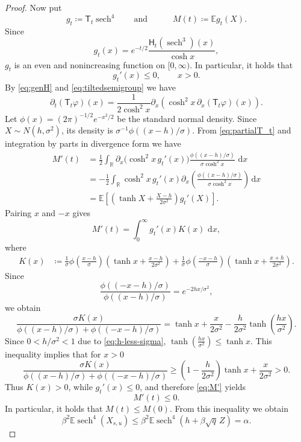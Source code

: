 \documentclass[11pt]{article}
\numberwithin{equation}{section}
\newcommand{\E}{\mathbb{E}}
\newcommand{\1}{\mathbf 1}
\newcommand{\sech}{\operatorname{sech}}
\newcommand{\dd}{\,\mathrm d}
\begin{document}
\begin{proof}
Now put
\[
 g_t\coloneqq\mathsf T_t \sech^4 \qquad \mbox{and}\quad
 \qquad
 M(t)\coloneqq\E g_t(X).
\]
Since
\[
 g_t(x)
 =
 e^{-t/2}\frac{\mathsf H_t(\sech^3)(x)}{\cosh x},
\]
$g_t$ is an even and nonincreasing function on $[0,\infty)$.
In particular, it holds that
\[
 g_t'(x)\le0,
 \qquad x>0.
\]
By \eqref{eq:genH} and \eqref{eq:tiltedsemigroup} we have
\begin{equation}\label{eq:partialT_t}
 \partial_t(\mathsf T_t\varphi)(x)
 =\frac{1}{2\cosh^2x}\partial_x\left(
   \cosh^2x\,\partial_x(\mathsf T_t\varphi)(x)
  \right).
\end{equation}
Let $\phi(x)=(2\pi)^{-1/2}e^{-x^2/2}$ be the standard normal density.
Since $X\sim N(h,\sigma^2)$, its density is
$\sigma^{-1}\phi((x-h)/\sigma)$.
From \eqref{eq:partialT_t} and integration by parts
in divergence form we have
\[
 \begin{aligned}
 M'(t)
 &=\frac12\int_{\mathbb R}
   \partial_x\bigl(\cosh^2x\,g_t'(x)\bigr)
   \frac{\phi((x-h)/\sigma)}{\sigma\cosh^2x}\,\dd x\\
 &=-\frac12\int_{\mathbb R}\cosh^2x\,g_t'(x)
   \partial_x\left(
     \frac{\phi((x-h)/\sigma)}{\sigma\cosh^2x}
   \right)\dd x\\
 &=\E\left[
   \left(\tanh X+\frac{X-h}{2\sigma^2}\right)g_t'(X)
 \right].
 \end{aligned}
\]
Pairing $x$ and $-x$
gives
\begin{equation}\label{eq:M'}
 M'(t)=\int_0^\infty g_t'(x)K(x)\,\dd x,
\end{equation}
where
\[
 \begin{aligned}
 K(x)
 &\coloneqq
 \frac1\sigma\phi\left(\frac{x-h}{\sigma}\right)
 \left(\tanh x+\frac{x-h}{2\sigma^2}\right)+
 \frac1\sigma\phi\left(\frac{-x-h}{\sigma}\right)
 \left(\tanh x+\frac{x+h}{2\sigma^2}\right).
 \end{aligned}
\]
Since
\[
 \frac{\phi((-x-h)/\sigma)}{\phi((x-h)/\sigma)}
 =e^{-2hx/\sigma^2},
\]
we obtain
\[
 \frac{\sigma K(x)}{
  \phi((x-h)/\sigma)+\phi((-x-h)/\sigma)}
 =
 \tanh x+\frac{x}{2\sigma^2}
 -\frac{h}{2\sigma^2}\tanh\left(\frac{hx}{\sigma^2}\right).
\]
Since $0<h/\sigma^2<1$ due to \eqref{eq:h-less-sigma},
\(
 \tanh\left(\frac{hx}{\sigma^2}\right)\le\tanh x .
\)
This inequality  implies that for $x>0$
\[
 \frac{\sigma K(x)}{
  \phi((x-h)/\sigma)+\phi((-x-h)/\sigma)}
 \ge
 \left(1-\frac{h}{2\sigma^2}\right)\tanh x
 +\frac{x}{2\sigma^2}
 >0.
\]
Thus $K(x)>0$, while $g_t'(x)\le0$, and therefore \eqref{eq:M'} yields
\[
 M'(t)\le0.
\]
In particular, it holds that $M(t)\le M(0)$. From this inequality we obtain
\[
 \beta^2\E\sech^4(X_{s,u})
 \le
 \beta^2\E\sech^4(h+\beta\sqrt q\,Z)
 =\alpha.
\]
\end{proof}
\end{document}
